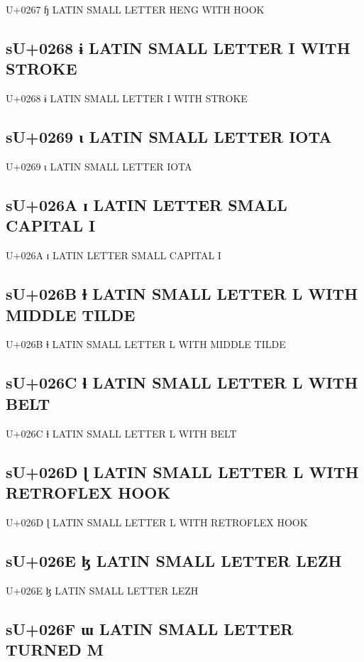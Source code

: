 U+0267 ɧ LATIN SMALL LETTER HENG WITH HOOK

\subsection{sU+0268 ɨ LATIN SMALL LETTER I WITH STROKE}

U+0268 ɨ LATIN SMALL LETTER I WITH STROKE

\subsection{sU+0269 ɩ LATIN SMALL LETTER IOTA}

U+0269 ɩ LATIN SMALL LETTER IOTA

\subsection{sU+026A ɪ LATIN LETTER SMALL CAPITAL I}

U+026A ɪ LATIN LETTER SMALL CAPITAL I

\subsection{sU+026B ɫ LATIN SMALL LETTER L WITH MIDDLE TILDE}

U+026B ɫ LATIN SMALL LETTER L WITH MIDDLE TILDE

\subsection{sU+026C ɬ LATIN SMALL LETTER L WITH BELT}

U+026C ɬ LATIN SMALL LETTER L WITH BELT

\subsection{sU+026D ɭ LATIN SMALL LETTER L WITH RETROFLEX HOOK}

U+026D ɭ LATIN SMALL LETTER L WITH RETROFLEX HOOK

\subsection{sU+026E ɮ LATIN SMALL LETTER LEZH}

U+026E ɮ LATIN SMALL LETTER LEZH

\subsection{sU+026F ɯ LATIN SMALL LETTER TURNED M}

